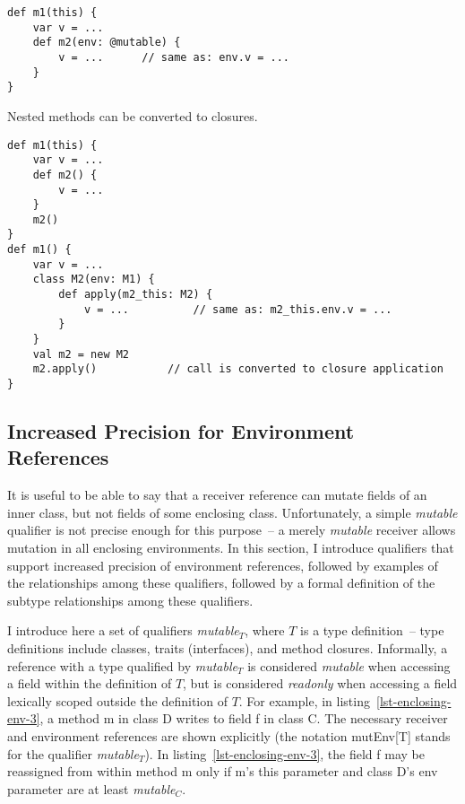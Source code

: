 \begin{lstlisting}[caption={Enclosing-method Variable access},float={htp},label={lst-encl-var-access}]
def m1(this) {
	var v = ...
	def m2(env: @mutable) {
		v = ...      // same as: env.v = ...
	}
}
\end{lstlisting}



Nested methods can be converted to closures.

\begin{lstlisting}[caption={Nested Methods},float={htp},label={lst-nested-methods}]
def m1(this) {
	var v = ...
	def m2() {
		v = ...
	}
	m2()
}
def m1() {
	var v = ...
	class M2(env: M1) {
		def apply(m2_this: M2) {
			v = ...          // same as: m2_this.env.v = ...
		}
	}
	val m2 = new M2
	m2.apply()           // call is converted to closure application
}
\end{lstlisting}


\subsection{Increased Precision for Environment References} \label{sec-env-precision}

It is useful to be able to say that a receiver reference can
mutate fields of an inner class, but not fields of some enclosing class.
Unfortunately, a simple \mbox{{\em mutable}} qualifier is not precise enough for
this purpose~-- a merely {\em mutable} receiver allows mutation in all enclosing environments.
In this section, I introduce qualifiers that support increased precision of environment
references, followed by examples of the relationships among these qualifiers,
followed by a formal definition of the subtype relationships among these
qualifiers.

I introduce here a set of qualifiers \mbox{{\em mutable}$_T$}, where $T$ is a
type definition~-- type definitions include classes, traits (interfaces),
and method closures.
Informally, a reference with a type qualified by \mbox{{\em mutable}$_T$}
is considered {\em mutable} when accessing a field within the definition of $T$,
but is considered {\em readonly} when accessing a field lexically scoped outside
the definition of $T$.
For example, in listing~\ref{lst-enclosing-env-3},
a method {\cd m} in class {\cd D} writes to field {\cd f} in class {\cd C}.
The necessary receiver and environment references are shown explicitly
(the notation {\cd mutEnv[T]} stands for the qualifier \mbox{{\em mutable}$_T$}).
In listing~\ref{lst-enclosing-env-3}, the field {\cd f} may be reassigned from within method {\cd m}
only if {\cd m}'s {\cd this} parameter and class {\cd D}'s {\cd env}
parameter are at least \mbox{{\em mutable}$_C$}.

